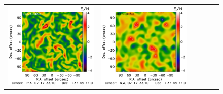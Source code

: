 \documentclass[twocolumn,traditabstract]{aa}
\begin{document}
\begin{figure}[h]
{\begin{tabular}{llllll}
\includegraphics[trim=2.3cm 0.7cm 0cm 0cm, clip=true, scale=1]{Figure/TFcheckGGM_RG474_00236_Ymap_zobs0p4_15_15_45.pdf} & 
\includegraphics[trim=2.3cm 0.7cm 0cm 0cm, clip=true, scale=1]{Figure/TFcheckDoG_RG474_00236_Ymap_zobs0p4_15_15_45.pdf} 
\end{tabular}}

\end{figure}
\end{document}
